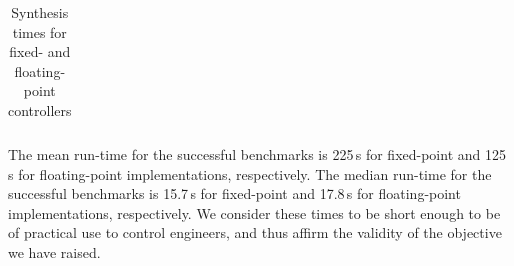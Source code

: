\begin{table}
\begin{tabular}{| l | c | c | r | c | r |}
\hline
%
\end{tabular}
\vspace{0.05in}
\caption{Synthesis times for fixed- and floating-point controllers\label{tab:results}}
\end{table}

The mean run-time for the successful benchmarks is 225\,s for fixed-point and 125\,s for floating-point implementations, respectively.  
The median run-time for the successful benchmarks is 15.7\,s for fixed-point and 17.8\,s for floating-point implementations, respectively.
We consider these times to be short enough to be of practical use to control engineers, and thus affirm the validity of 
the objective we have raised. 

